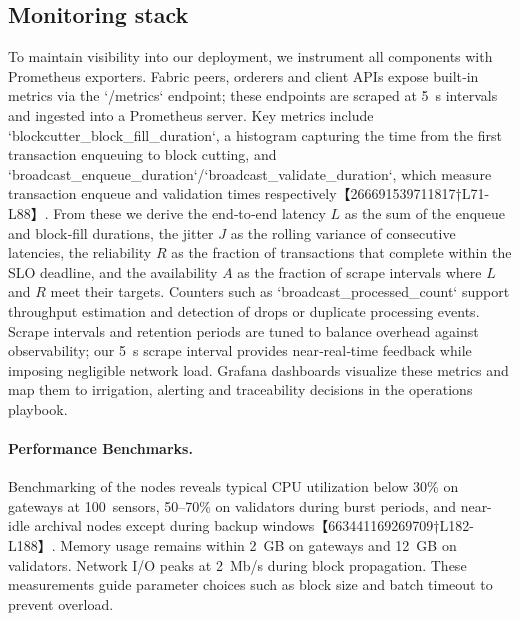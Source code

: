 \documentclass[12pt,onecolumn]{IEEEtran} %
\begin{document}
\subsection{Monitoring stack}
To maintain visibility into our deployment, we instrument all components with Prometheus exporters.  Fabric peers, orderers and client APIs expose built‑in metrics via the `/metrics` endpoint; these endpoints are scraped at 5~s intervals and ingested into a Prometheus server.  Key metrics include `blockcutter_block_fill_duration`, a histogram capturing the time from the first transaction enqueuing to block cutting, and `broadcast_enqueue_duration`/`broadcast_validate_duration`, which measure transaction enqueue and validation times respectively【266691539711817†L71-L88】.  From these we derive the end‑to‑end latency $L$ as the sum of the enqueue and block‑fill durations, the jitter $J$ as the rolling variance of consecutive latencies, the reliability $R$ as the fraction of transactions that complete within the SLO deadline, and the availability $A$ as the fraction of scrape intervals where $L$ and $R$ meet their targets.  Counters such as `broadcast_processed_count` support throughput estimation and detection of drops or duplicate processing events.  Scrape intervals and retention periods are tuned to balance overhead against observability; our 5~s scrape interval provides near‑real‑time feedback while imposing negligible network load.  Grafana dashboards visualize these metrics and map them to irrigation, alerting and traceability decisions in the operations playbook.

\paragraph{Performance Benchmarks.}  Benchmarking of the nodes reveals typical CPU utilization below 30\% on gateways at 100~sensors, 50–70\% on validators during burst periods, and near-idle archival nodes except during backup windows【663441169269709†L182-L188】.  Memory usage remains within 2~GB on gateways and 12~GB on validators.  Network I/O peaks at 2~Mb/s during block propagation.  These measurements guide parameter choices such as block size and batch timeout to prevent overload.
\end{document}
